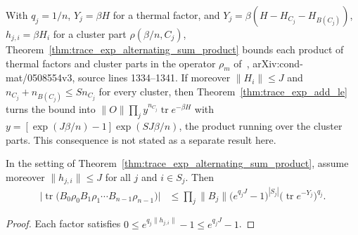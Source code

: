 \begin{remark}
    With $q_j=1/n$, $Y_j=\beta H$ for a thermal factor, and
    $Y_j=\beta(H-H_{C_j}-H_{B(C_j)})$, $h_{j,i}=\beta H_i$ for a cluster
    part $\rho(\beta/n,C_j)$,
    Theorem~\ref{thm:trace_exp_alternating_sum_product} bounds each product
    of thermal factors and cluster parts in the operator $\rho_m$
    of~\cite{Hastings2006Solving}, arXiv:cond-mat/0508554v3, source lines
    1334--1341. If moreover $\|H_i\|\le J$ and
    $n_{C_j}+n_{B(C_j)}\le Sn_{C_j}$ for every cluster, then
    Theorem~\ref{thm:trace_exp_add_le} turns the bound into
    $\|O\|\prod_jy^{n_{C_j}}\operatorname{tr}e^{-\beta H}$ with
    $y=[\exp(J\beta/n)-1]\exp(SJ\beta/n)$, the product running over the
    cluster parts. This consequence is not stated as a separate result here.
\end{remark}

\begin{theorem}
    \label{thm:trace_exp_alternating_sum_product_pow}
    \leanok
    In the setting of Theorem~\ref{thm:trace_exp_alternating_sum_product},
    assume moreover $\|h_{j,i}\|\le J$ for all $j$ and $i\in S_j$. Then
    \begin{align}
        \bigl|\operatorname{tr}\bigl(B_0\rho_0B_1\rho_1\cdots B_{n-1}\rho_{n-1}\bigr)\bigr|
         & \le\prod_j\|B_j\|\bigl(e^{q_jJ}-1\bigr)^{|S_j|}
        \bigl(\operatorname{tr}e^{-Y_j}\bigr)^{q_j}.
    \end{align}
\end{theorem}
\begin{proof}\leanok
    Each factor satisfies $0\le e^{q_j\|h_{j,i}\|}-1\le e^{q_jJ}-1$.
\end{proof}
